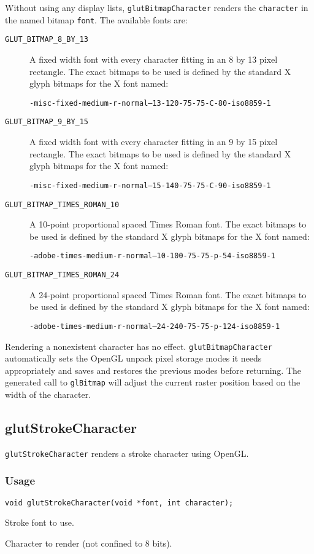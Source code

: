 Without using any display lists, {\tt glutBitmapCharacter} renders the {\tt character}
in the named bitmap {\tt font}.  The available fonts are:
\begin{description}
\item[{\tt GLUT\_BITMAP\_8\_BY\_13}]
A fixed width font with every character fitting in an 8 by 13 pixel
rectangle.  The exact bitmaps to be used is defined by the standard X glyph
bitmaps for the X font named:

{\tt -misc-fixed-medium-r-normal--13-120-75-75-C-80-iso8859-1}

\item[{\tt GLUT\_BITMAP\_9\_BY\_15}]
A fixed width font with every character fitting in an 9 by 15 pixel
rectangle.  The exact bitmaps to be used is defined by the standard X glyph
bitmaps for the X font named:

{\tt -misc-fixed-medium-r-normal--15-140-75-75-C-90-iso8859-1}

\item[{\tt GLUT\_BITMAP\_TIMES\_ROMAN\_10}]
A 10-point proportional spaced
Times Roman font.  The exact bitmaps to be used is defined by the
standard X glyph bitmaps for the X font named:

{\tt -adobe-times-medium-r-normal--10-100-75-75-p-54-iso8859-1}

\item[{\tt GLUT\_BITMAP\_TIMES\_ROMAN\_24}]
A 24-point proportional spaced
Times Roman font.  The exact bitmaps to be used is defined by the
standard X glyph bitmaps for the X font named:

{\tt -adobe-times-medium-r-normal--24-240-75-75-p-124-iso8859-1}

\end{description}
Rendering a nonexistent character has no effect.  {\tt glutBitmapCharacter} automatically
sets the OpenGL unpack pixel storage modes it needs appropriately and saves and restores
the previous modes before returning.  The generated call to {\tt glBitmap} will
adjust the current raster position based on the width of the character.

\subsection{glutStrokeCharacter}

{\tt glutStrokeCharacter} renders a stroke character using OpenGL.

\subsubsection*{Usage}
\begin{verbatim}
void glutStrokeCharacter(void *font, int character);
\end{verbatim}
\begin{description}
\itemsep 0in
\item[\tt font]
Stroke font to use.
\item[\tt character]
Character to render (not confined to 8 bits).
\end{description}

